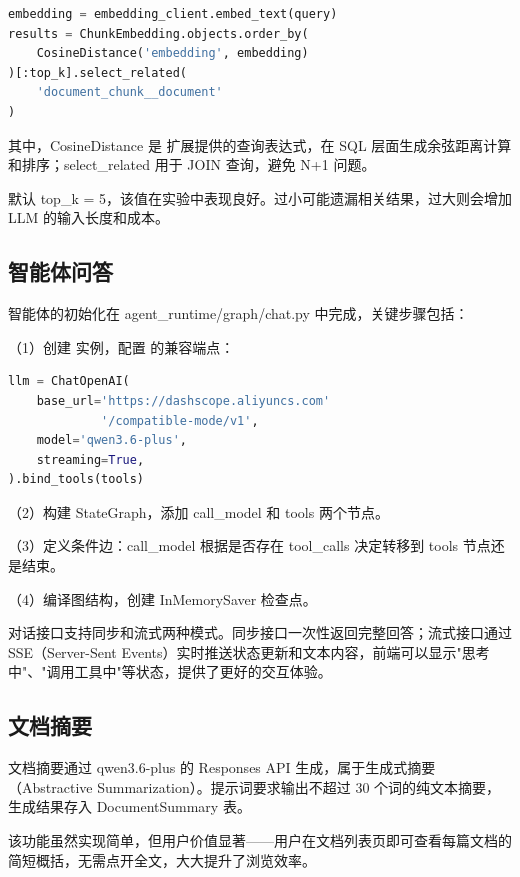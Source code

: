 \begin{lstlisting}[style=mtcode,language=Python,caption={基于向量距离的检索实现}]
embedding = embedding_client.embed_text(query)
results = ChunkEmbedding.objects.order_by(
    CosineDistance('embedding', embedding)
)[:top_k].select_related(
    'document_chunk__document'
)
\end{lstlisting}

其中，CosineDistance 是   扩展提供的查询表达式，在 SQL 层面生成余弦距离计算和排序；select\_related 用于 JOIN 查询，避免 N+1 问题。

默认 top\_k = 5，该值在实验中表现良好。过小可能遗漏相关结果，过大则会增加 LLM 的输入长度和成本。

\subsection{智能体问答}

智能体的初始化在 agent\_runtime/graph/chat.py 中完成，关键步骤包括：

（1）创建  实例，配置  的兼容端点：

\begin{lstlisting}[style=mtcode,language=Python,caption={智能体模型初始化}]
llm = ChatOpenAI(
    base_url='https://dashscope.aliyuncs.com'
             '/compatible-mode/v1',
    model='qwen3.6-plus',
    streaming=True,
).bind_tools(tools)
\end{lstlisting}

（2）构建 StateGraph，添加 call\_model 和 tools 两个节点。

（3）定义条件边：call\_model 根据是否存在 tool\_calls 决定转移到 tools 节点还是结束。

（4）编译图结构，创建 InMemorySaver 检查点。

对话接口支持同步和流式两种模式。同步接口一次性返回完整回答；流式接口通过 SSE（Server-Sent Events）实时推送状态更新和文本内容，前端可以显示"思考中"、"调用工具中"等状态，提供了更好的交互体验。

\subsection{文档摘要}

文档摘要通过 qwen3.6-plus 的 Responses API 生成，属于生成式摘要（Abstractive Summarization）\cite{see2017pgsum}。提示词要求输出不超过 30 个词的纯文本摘要，生成结果存入 DocumentSummary 表。

该功能虽然实现简单，但用户价值显著——用户在文档列表页即可查看每篇文档的简短概括，无需点开全文，大大提升了浏览效率。

